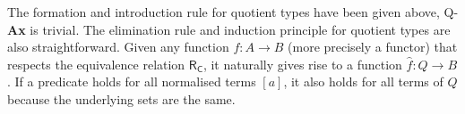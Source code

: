 \begin{code}
\\
\>[2]\<[4]%
\>[4]\AgdaSymbol{;}  \AgdaSymbol{=}           \AgdaSymbol{\_} \AgdaSymbol{\_} \AgdaSymbol{(}\AgdaFunction{[}  \AgdaFunction{]refl*} \AgdaSymbol{\_} \AgdaSymbol{\_)}\<%
\\
\>[2]\<[4]%
\>[4]\AgdaSymbol{;}  \AgdaSymbol{=}          \AgdaSymbol{\_} \AgdaSymbol{\_} \AgdaSymbol{(}\AgdaFunction{[}  \AgdaFunction{]trans*} \AgdaSymbol{\_)}\<%
\\
\>[2]\<[4]%
\>[4]\AgdaSymbol{\}}\<%
\\
%
\\
\>[0]\<[2]%
\>[2] \AgdaSymbol{:}     \<%
\\
\>[0]\<[2]%
\>[2]\AgdaFunction{⟦[}  \AgdaFunction{]⟧} \AgdaSymbol{=} \<%
\\
\>[2]\<[11]%
\>[11]\AgdaSymbol{\{}  \AgdaSymbol{=} \AgdaFunction{[}  \AgdaFunction{]tm}\<%
\\
\>[2]\<[11]%
\>[11]\AgdaSymbol{;}  \AgdaSymbol{=}    \AgdaBound{\_} \AgdaBound{\_}  \AgdaBound{\_}   \AgdaSymbol{\_} \AgdaSymbol{\_} \AgdaSymbol{(}\AgdaFunction{[}  \AgdaFunction{]respt} \AgdaSymbol{)}\<%
\\
\>[2]\<[11]%
\>[11]\AgdaSymbol{\}}\<%
\\
\end{code}

The formation and introduction rule for quotient types have been given above, Q-\textbf{Ax} is trivial. The elimination rule and induction principle for quotient types are also straightforward. Given any function $f : A \to B$ (more precisely a functor) that respects the equivalence relation $\mathsf{R_C}$, it naturally gives rise to a function $\hat{f} : Q \to B$. If a predicate holds for all normalised terms $[a]$, it also holds for all terms of $Q$ because the underlying sets are the same.




